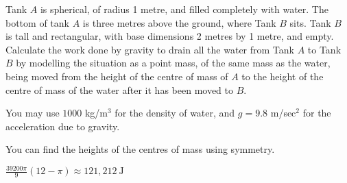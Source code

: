 \begin{question}\label{prob_s2.3tank1}
Tank $A$ is spherical, of radius 1 metre, and filled completely with water. The bottom of tank $A$ is three metres above the ground, where Tank $B$ sits. Tank $B$ is tall and rectangular, with base dimensions 2 metres by 1 metre, and empty. Calculate the work done by gravity to drain all the water from Tank $A$ to Tank $B$ by modelling the situation as a point mass, of the same mass as the water, being moved from the height of the centre of mass of $A$ to the height of the centre of mass of the water after it has been moved to $B$.

\begin{center}
\end{center}
You may use $1000$ kg/m$^3$ for the density of water, and $g=9.8$ m/sec$^2$ for the acceleration due to gravity.
\end{question}
\begin{hint}
You can find the heights of the centres of mass using symmetry.
\end{hint}
\begin{answer}
$\displaystyle\frac{39200\pi}{9}(12-\pi)\approx 121,212~\text{J}$
\end{answer}
